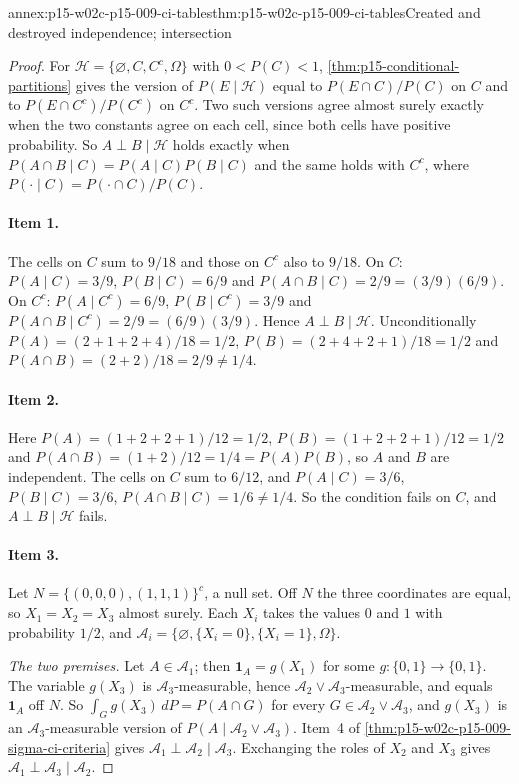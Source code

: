 \begin{annexitem}{annex:p15-w02c-p15-009-ci-tables}{thm:p15-w02c-p15-009-ci-tables}{Created and destroyed independence; intersection}
\begin{proof}
For \(\mathcal H=\{\varnothing,C,C^c,\Omega\}\) with \(0<P(C)<1\),
\cref{thm:p15-conditional-partitions} gives the version of
\(P(E\mid\mathcal H)\) equal to \(P(E\cap C)/P(C)\) on \(C\) and to
\(P(E\cap C^c)/P(C^c)\) on \(C^c\). Two such versions agree almost surely
exactly when the two constants agree on each cell, since both cells have
positive probability. So \(A\perp B\mid\mathcal H\) holds exactly when
\(P(A\cap B\mid C)=P(A\mid C)P(B\mid C)\) and the same holds with \(C^c\),
where \(P(\cdot\mid C)=P(\cdot\cap C)/P(C)\).

\paragraph{Item 1.} The cells on \(C\) sum to \(9/18\) and those on \(C^c\)
also to \(9/18\). On \(C\): \(P(A\mid C)=3/9\), \(P(B\mid C)=6/9\) and
\(P(A\cap B\mid C)=2/9=(3/9)(6/9)\). On \(C^c\): \(P(A\mid C^c)=6/9\),
\(P(B\mid C^c)=3/9\) and \(P(A\cap B\mid C^c)=2/9=(6/9)(3/9)\). Hence
\(A\perp B\mid\mathcal H\). Unconditionally \(P(A)=(2+1+2+4)/18=1/2\),
\(P(B)=(2+4+2+1)/18=1/2\) and \(P(A\cap B)=(2+2)/18=2/9\ne1/4\).

\paragraph{Item 2.} Here \(P(A)=(1+2+2+1)/12=1/2\),
\(P(B)=(1+2+2+1)/12=1/2\) and \(P(A\cap B)=(1+2)/12=1/4=P(A)P(B)\), so
\(A\) and \(B\) are independent. The cells on \(C\) sum to \(6/12\), and
\(P(A\mid C)=3/6\), \(P(B\mid C)=3/6\), \(P(A\cap B\mid C)=1/6\ne1/4\).
So the condition fails on \(C\), and \(A\perp B\mid\mathcal H\) fails.

\paragraph{Item 3.} Let \(N=\{(0,0,0),(1,1,1)\}^c\), a null set. Off \(N\)
the three coordinates are equal, so \(X_1=X_2=X_3\) almost surely. Each
\(X_i\) takes the values \(0\) and \(1\) with probability \(1/2\), and
\(\mathcal A_i=\{\varnothing,\{X_i=0\},\{X_i=1\},\Omega\}\).

\emph{The two premises.} Let \(A\in\mathcal A_1\); then
\(\mathbf1_A=g(X_1)\) for some \(g:\{0,1\}\to\{0,1\}\). The variable
\(g(X_3)\) is \(\mathcal A_3\)-measurable, hence
\(\mathcal A_2\vee\mathcal A_3\)-measurable, and equals \(\mathbf1_A\)
off \(N\). So \(\int_Gg(X_3)\,dP=P(A\cap G)\) for every
\(G\in\mathcal A_2\vee\mathcal A_3\), and \(g(X_3)\) is an
\(\mathcal A_3\)-measurable version of \(P(A\mid\mathcal A_2\vee\mathcal A_3)\).
Item~4 of \cref{thm:p15-w02c-p15-009-sigma-ci-criteria} gives
\(\mathcal A_1\perp\mathcal A_2\mid\mathcal A_3\). Exchanging the roles of
\(X_2\) and \(X_3\) gives \(\mathcal A_1\perp\mathcal A_3\mid\mathcal A_2\).


\end{proof}
\end{annexitem}
